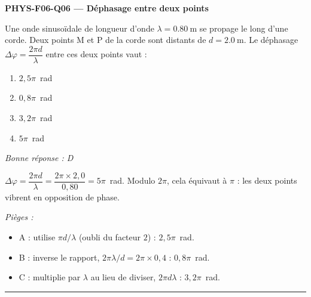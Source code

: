 \documentclass[11pt,a4paper]{article}
\begin{document}
\noindent\textbf{PHYS-F06-Q06 --- Déphasage entre deux points}\par
Une onde sinusoïdale de longueur d'onde $\lambda = \qty{0.80}{\metre}$ se propage le long d'une corde. Deux points M et P de la corde sont distants de $d = \qty{2.0}{\metre}$. Le déphasage $\Delta\varphi = \dfrac{2\pi d}{\lambda}$ entre ces deux points vaut :
\begin{enumerate}[label=\Alph*)]
\item $2{,}5\pi$~rad
\item $0{,}8\pi$~rad
\item $3{,}2\pi$~rad
\item $5\pi$~rad
\end{enumerate}
\textit{Bonne réponse : D}\par
$\Delta\varphi = \dfrac{2\pi d}{\lambda} = \dfrac{2\pi \times 2{,}0}{0{,}80} = 5\pi$~rad. Modulo $2\pi$, cela équivaut à $\pi$ : les deux points vibrent en opposition de phase.\par
\textit{Pièges :}
\begin{itemize}
\item A : utilise $\pi d/\lambda$ (oubli du facteur $2$) : $2{,}5\pi$~rad.
\item B : inverse le rapport, $2\pi\lambda/d = 2\pi\times0{,}4$ : $0{,}8\pi$~rad.
\item C : multiplie par $\lambda$ au lieu de diviser, $2\pi d\lambda$ : $3{,}2\pi$~rad.
\end{itemize}
\vspace{8pt}\hrule\vspace{8pt}
\end{document}
